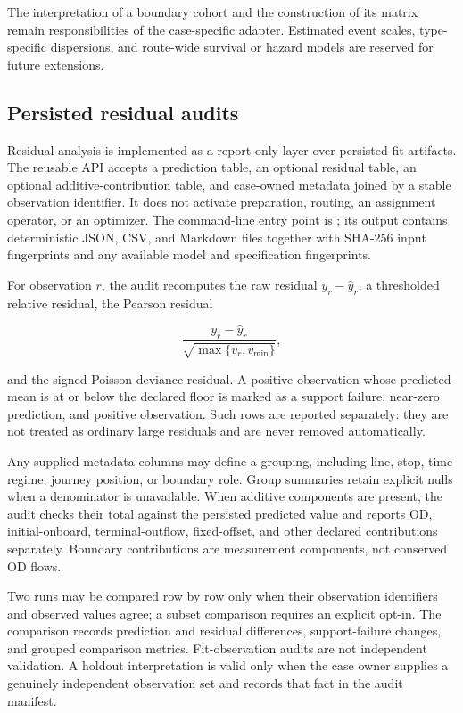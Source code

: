 The interpretation of a boundary cohort and the construction of its matrix
remain responsibilities of the case-specific adapter.  Estimated event
scales, type-specific dispersions, and route-wide survival or hazard models
are reserved for future extensions.

\subsection{Persisted residual audits}

Residual analysis is implemented as a report-only layer over persisted fit
artifacts.  The reusable API accepts a prediction table, an optional residual
table, an optional additive-contribution table, and case-owned metadata joined
by a stable observation identifier.  It does not activate preparation,
routing, an assignment operator, or an optimizer.  The command-line entry
point is
; its output
contains deterministic JSON, CSV, and Markdown files together with SHA-256
input fingerprints and any available model and specification fingerprints.

For observation $r$, the audit recomputes the raw residual
$y_r-\widehat{y}_r$, a thresholded relative residual, the Pearson residual

\[
  \frac{y_r-\widehat{y}_r}
       {\sqrt{\max\{v_r,v_{\min}\}}},
\]

and the signed Poisson deviance residual.  A positive observation whose
predicted mean is at or below the declared floor is marked as a support
failure, near-zero prediction, and positive observation.  Such rows are
reported separately: they are not treated as ordinary large residuals and are
never removed automatically.

Any supplied metadata columns may define a grouping, including line, stop,
time regime, journey position, or boundary role.  Group summaries retain
explicit nulls when a denominator is unavailable.  When additive components
are present, the audit checks their total against the persisted predicted
value and reports OD, initial-onboard, terminal-outflow, fixed-offset, and
other declared contributions separately.  Boundary contributions are
measurement components, not conserved OD flows.

Two runs may be compared row by row only when their observation identifiers
and observed values agree; a subset comparison requires an explicit opt-in.
The comparison records prediction and residual differences, support-failure
changes, and grouped comparison metrics.  Fit-observation audits are not
independent validation.  A holdout interpretation is valid only when the
case owner supplies a genuinely independent observation set and records that
fact in the audit manifest.
